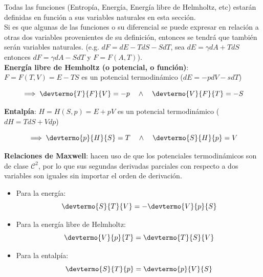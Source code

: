 Todas las funciones (Entropía, Energía, Energía libre de Helmholtz, etc) estarán definidas en función a sus variables naturales en esta sección.\\

Si es que algunas de las funciones o su diferencial se puede expresar en relación a otras dos variables provenientes de su definición, entonces se tendrá que también serán variables naturales. (e.g. $dF = dE - TdS - SdT$, sea $dE = \gamma dA + TdS$ entonces $dF = \gamma dA - SdT$ y $F = F(A,T)$).\\

\textbf{Energía libre de Hemholtz (o potencial, o función)}: $F = F(T,V)=E-TS$ es un potencial termodinámico ($dE = -pdV - sdT$)

\[\implies \devtermo{T}{F}{V} = -p \quad \land \quad \devtermo{V}{F}{T} = -S\]

\textbf{Entalpía}: $H =H(S,p)=E+pV$ es un potencial termodinámico ($dH = TdS + Vdp$)

\[\implies \devtermo{p}{H}{S} = T \quad \land \quad \devtermo{S}{H}{p} = V\]



\textbf{Relaciones de Maxwell}: \label{relaciones-maxwell} hacen uso de que los potenciales termodinámicos son de clase $\mathcal{C}^2$, por lo que sus segundas derivadas parciales con respecto a dos variables son iguales sin importar el orden de derivación. 

\begin{itemize}
    \item Para la energía:
    \[\devtermo{S}{T}{V} = -\devtermo{V}{p}{S}\]
    \item Para la energía libre de Helmholtz:
    \[\devtermo{V}{p}{T} = \devtermo{T}{S}{V}\]
    \item Para la entalpía:
    \[ \devtermo{S}{T}{p} = \devtermo{p}{V}{S} \]
\end{itemize}

\newpage